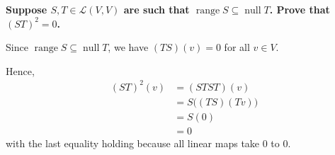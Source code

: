 \documentclass[a5paper]{article}
\begin{document}
\newcommand    \C  { \mathbf{C} }
\newcommand    \R  { \mathbf{R} }
\renewcommand  \L  { \mathcal{L} }
\newcommand    \F  { \mathbf{F} }
\renewcommand \P           {\mathcal{P}}
\newcommand   \question[1] {\textbf{\boldmath#1\unboldmath}\par}
\newcommand   \op          {\operatorname}

\question{
    Suppose $S, T \in \L(V,V)$ are such that $\op{range}S \subseteq \op{null}T$.
    Prove that $(ST)^2 = 0$.
}

    Since $\op{range}S \subseteq \op{null}T$, we have $(TS)(v) = 0$ for all $v \in V$.

    Hence,
\begin{align*}
    (ST)^2(v) &= (STST)(v)                      \\
              &= S \big( (TS)(Tv) \big)         \\
              &= S (0)                          \\
              &= 0
\end{align*}
    with the last equality holding because all linear maps take 0 to 0.
\end{document}
